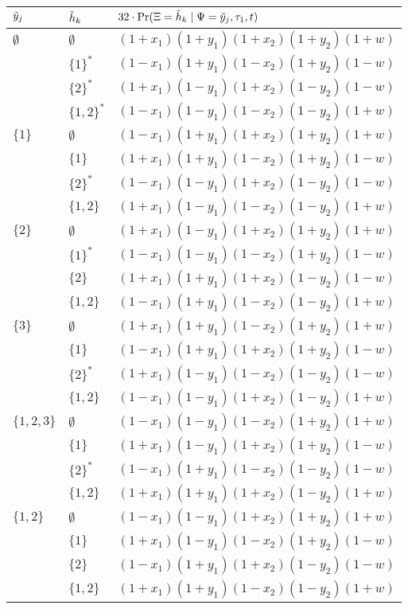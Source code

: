 \begin{table}
\centering
\begin{tabular}{|l|ll|}
\hline
$\tilde{y}_j$ & $\tilde{h}_k$ & $32\cdot\Pr(\Xi=\tilde{h}_k \mid \Psi=\tilde{y}_j, \tau_1, t)$\\
\hline
$\emptyset$&$\emptyset$&$(1+x_1)(1+y_1)(1+x_2)(1+y_2)(1+w)$\\
&$\{1\}^*$&$(1-x_1)(1+y_1)(1-x_2)(1+y_2)(1-w)$             \\
&$\{2\}^*$&$(1+x_1)(1-y_1)(1+x_2)(1-y_2)(1-w)$             \\
&$\{1,2\}^*$&$(1-x_1)(1-y_1)(1-x_2)(1-y_2)(1+w)$           \\

$\{1\}$    &$\emptyset$&$(1-x_1)(1+y_1)(1+x_2)(1+y_2)(1+w)$\\
&$\{1\}$&$(1+x_1)(1+y_1)(1-x_2)(1+y_2)(1-w)$               \\
&$\{2\}^*$&$(1-x_1)(1-y_1)(1+x_2)(1-y_2)(1-w)$             \\
&$\{1,2\}$&$(1+x_1)(1-y_1)(1-x_2)(1-y_2)(1+w)$             \\

$\{2\}$    &$\emptyset$&$(1+x_1)(1-y_1)(1+x_2)(1+y_2)(1+w)$\\
&$\{1\}^*$&$(1-x_1)(1-y_1)(1-x_2)(1+y_2)(1-w)$             \\
&$\{2\}$&$(1+x_1)(1+y_1)(1+x_2)(1-y_2)(1-w)$               \\
&$\{1,2\}$&$(1-x_1)(1+y_1)(1-x_2)(1-y_2)(1+w)$             \\

$\{3\}$    &$\emptyset$&$(1+x_1)(1+y_1)(1-x_2)(1+y_2)(1+w)$\\
&$\{1\}$&$(1-x_1)(1+y_1)(1+x_2)(1+y_2)(1-w)$               \\
&$\{2\}^*$&$(1+x_1)(1-y_1)(1-x_2)(1-y_2)(1-w)$             \\
&$\{1,2\}$&$(1-x_1)(1-y_1)(1+x_2)(1-y_2)(1+w)$             \\

$\{1,2,3\}$&$\emptyset$&$(1-x_1)(1-y_1)(1-x_2)(1+y_2)(1+w)$\\
&$\{1\}$&$(1+x_1)(1-y_1)(1+x_2)(1+y_2)(1-w)$               \\
&$\{2\}^*$&$(1-x_1)(1+y_1)(1-x_2)(1-y_2)(1-w)$             \\
&$\{1,2\}$&$(1+x_1)(1+y_1)(1+x_2)(1-y_2)(1+w)$             \\

$\{1,2\}$  &$\emptyset$&$(1-x_1)(1-y_1)(1+x_2)(1+y_2)(1+w)$\\
&$\{1\}$&$(1+x_1)(1-y_1)(1-x_2)(1+y_2)(1-w)$               \\
&$\{2\}$&$(1-x_1)(1+y_1)(1+x_2)(1-y_2)(1-w)$               \\
&$\{1,2\}$&$(1+x_1)(1+y_1)(1-x_2)(1-y_2)(1+w)$             \\


\end{tabular}
\end{table}
